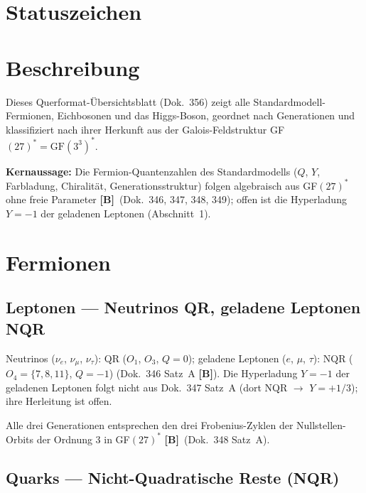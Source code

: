 \providecommand{\BM}{\textbf{[B]}}
\providecommand{\KM}{\textbf{[K]}}
\providecommand{\SM}{\textbf{[S]}}
\providecommand{\XM}{\textbf{[X]}}

{}

\section*{Statuszeichen}


\section*{Beschreibung}

Dieses Querformat-Übersichtsblatt (Dok.~356) zeigt alle Standardmodell-Fermionen,
Eichbosonen und das Higgs-Boson, geordnet nach Generationen und
klassifiziert nach ihrer Herkunft aus der Galois-Feldstruktur
GF$(27)^* = \mathrm{GF}(3^3)^*$.

\textbf{Kernaussage:} Die Fermion-Quantenzahlen des Standardmodells
($Q$, $Y$, Farbladung, Chiralität, Generationsstruktur) folgen algebraisch
aus GF$(27)^*$ ohne freie Parameter \BM\ (Dok.~346, 347, 348, 349);
offen ist die Hyperladung $Y = -1$ der geladenen Leptonen (Abschnitt~1).

\section{Fermionen}

\subsection*{Leptonen --- Neutrinos QR, geladene Leptonen NQR}

Neutrinos ($\nu_e$, $\nu_\mu$, $\nu_\tau$): QR ($O_1$, $O_3$, $Q = 0$);
geladene Leptonen ($e$, $\mu$, $\tau$): NQR ($O_4 = \{7,8,11\}$, $Q = -1$)
(Dok.~346 Satz~A \BM).
Die Hyperladung $Y = -1$ der geladenen Leptonen folgt nicht aus Dok.~347 Satz~A
(dort NQR $\to$ $Y = +1/3$); ihre Herleitung ist offen.

Alle drei Generationen entsprechen den drei Frobenius-Zyklen der
Nullstellen-Orbits der Ordnung 3 in GF$(27)^*$ \BM\ (Dok.~348 Satz~A).

\subsection*{Quarks --- Nicht-Quadratische Reste (NQR)}

